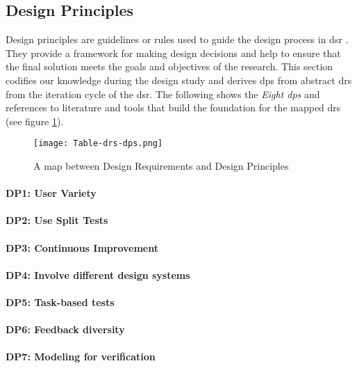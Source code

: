 \subsection{Design Principles}
\label{design:section:designprinciple}
Design principles are guidelines or rules used to guide the design process in \ac{dsr} \cite{misc:dsr:henver}. 
They provide a framework for making design decisions \cite{paper:designprinciple:gregor} and help to ensure that the final solution meets the goals and objectives of the research. 
This section codifies our knowledge during the design study and derives \ac{dp}s from abstract \ac{dr}s from the iteration cycle of the \ac{dsr}.
The following shows the \textit{Eight \ac{dp}s} and references to literature and tools that build the foundation for the mapped \ac{dr}s (see figure \ref{fig:design:table-drs-dps}). 
\begin{figure}[htbp!]
  \centering    
  \texttt{[image: Table-drs-dps.png]}
  \caption[A map between \ac{dr}s and \ac{dp}s]{A map between Design Requirements and Design Principles}
  \label{fig:design:table-drs-dps}
\end{figure}

\paragraph{DP1: User Variety} \textit{}
\paragraph{DP2: Use Split Tests}
\paragraph{DP3: Continuous Improvement}
\paragraph{DP4: Involve different design systems}
\paragraph{DP5: Task-based tests}
\paragraph{DP6: Feedback diversity}
\paragraph{DP7: Modeling for verification}

